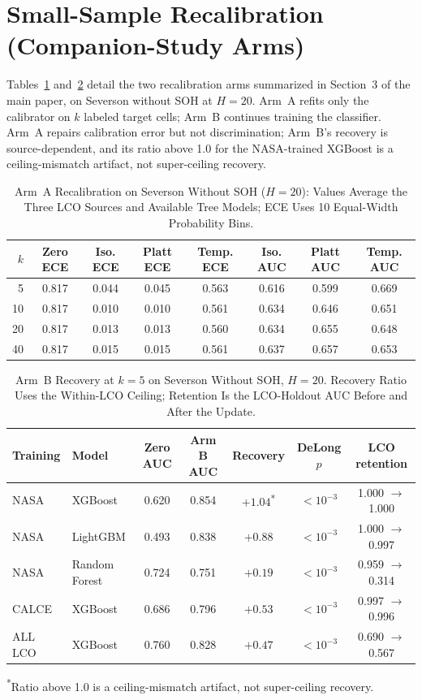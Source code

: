 \documentclass[11pt,a4paper]{article}
\begin{document}
\section{Small-Sample Recalibration (Companion-Study Arms)}
Tables~\ref{tab:s_recA} and~\ref{tab:s_recB} detail the two recalibration arms summarized in Section~3 of the main paper, on Severson without SOH at $H{=}20$. Arm~A refits only the calibrator on $k$ labeled target cells; Arm~B continues training the classifier. Arm~A repairs calibration error but not discrimination; Arm~B's recovery is source-dependent, and its ratio above 1.0 for the NASA-trained XGBoost is a ceiling-mismatch artifact, not super-ceiling recovery.
\begin{table}[!t]
\caption{Arm~A Recalibration on Severson Without SOH ($H{=}20$): Values Average the Three LCO Sources and Available Tree Models; ECE Uses 10 Equal-Width Probability Bins.}
\label{tab:s_recA}
\centering\footnotesize\setlength{\tabcolsep}{4pt}
\begin{tabular}{rccccccc}
\toprule
$k$ & \textbf{Zero ECE} & \textbf{Iso. ECE} & \textbf{Platt ECE} & \textbf{Temp. ECE} & \textbf{Iso. AUC} & \textbf{Platt AUC} & \textbf{Temp. AUC}\\
\midrule
5 & 0.817 & 0.044 & 0.045 & 0.563 & 0.616 & 0.599 & 0.669\\
10 & 0.817 & 0.010 & 0.010 & 0.561 & 0.634 & 0.646 & 0.651\\
20 & 0.817 & 0.013 & 0.013 & 0.560 & 0.634 & 0.655 & 0.648\\
40 & 0.817 & 0.015 & 0.015 & 0.561 & 0.637 & 0.657 & 0.653\\
\bottomrule
\end{tabular}
\end{table}

\begin{table}[!t]
\caption{Arm~B Recovery at $k{=}5$ on Severson Without SOH, $H{=}20$. Recovery Ratio Uses the Within-LCO Ceiling; Retention Is the LCO-Holdout AUC Before and After the Update.}
\label{tab:s_recB}
\centering\footnotesize\setlength{\tabcolsep}{3pt}
\begin{tabular}{llccccc}
\toprule
\textbf{Training} & \textbf{Model} & \textbf{Zero AUC} & \textbf{Arm B AUC} & \textbf{Recovery} & \textbf{DeLong $p$} & \textbf{LCO retention}\\
\midrule
NASA & XGBoost & 0.620 & 0.854 & $+1.04$\textsuperscript{*} & $<10^{-3}$ & 1.000 $\rightarrow$ 1.000\\
NASA & LightGBM & 0.493 & 0.838 & $+0.88$ & $<10^{-3}$ & 1.000 $\rightarrow$ 0.997\\
NASA & Random Forest & 0.724 & 0.751 & $+0.19$ & $<10^{-3}$ & 0.959 $\rightarrow$ 0.314\\
CALCE & XGBoost & 0.686 & 0.796 & $+0.53$ & $<10^{-3}$ & 0.997 $\rightarrow$ 0.996\\
ALL LCO & XGBoost & 0.760 & 0.828 & $+0.47$ & $<10^{-3}$ & 0.690 $\rightarrow$ 0.567\\
\bottomrule
\end{tabular}
\footnotesize\textsuperscript{*}Ratio above 1.0 is a ceiling-mismatch artifact, not super-ceiling recovery.
\end{table}
\end{document}
